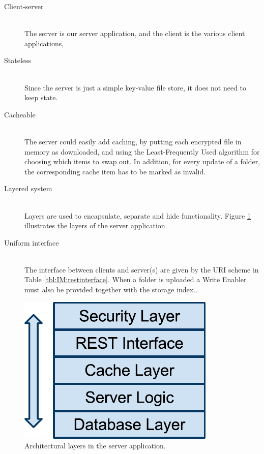 \documentclass[pdftex,english,10pt,b5paper,twoside]{book}
\begin{document}
\begin{description}
  \item[Client-server] \hfill \\
    The server is our server application, and the client is the various client
    applications,

  \item[Stateless] \hfill \\
    Since the server is just a simple key-value file store, it does
    not need to keep state.

  \item[Cacheable] \hfill \\
    The server could easily add caching, by putting each encrypted file in
    memory as downloaded, and using the Least-Frequently Used algorithm for
    choosing which items to swap out. In addition, for every update of a folder,
    the corresponding cache item has to be marked as invalid.

  \item[Layered system] \hfill \\
    Layers are used to encapsulate, separate and hide functionality.
    Figure \ref{fig:IM:layers} illustrates the layers of the server application.

  \item[Uniform interface] \hfill \\
    The interface between clients and server(s) are given by the URI scheme in
    Table \ref{tbl:IM:restinterface}. When a folder is uploaded a Write Enabler
    must also be provided together with the storage index..
\end{description}

\begin{figure}[h!]
    \centering
    \includegraphics[scale=0.6]{ImplementationServerLayers.pdf}
    \caption{Architectural layers in the server application.}
    \label{fig:IM:layers}
\end{figure}
\end{document}
